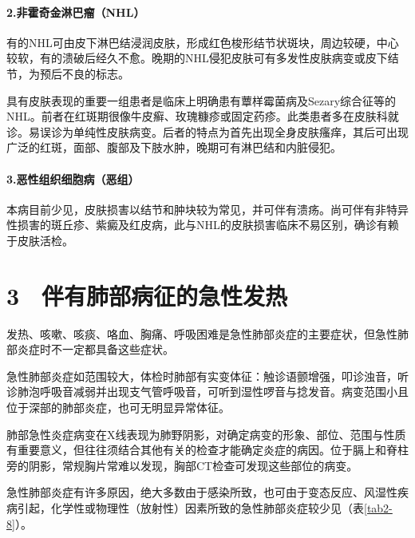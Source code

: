 \paragraph{2.非霍奇金淋巴瘤（NHL）}

有的NHL可由皮下淋巴结浸润皮肤，形成红色梭形结节状斑块，周边较硬，中心较软，有的溃破后经久不愈。晚期的NHL侵犯皮肤可有多发性皮肤病变或皮下结节，为预后不良的标志。

具有皮肤表现的重要一组患者是临床上明确患有蕈样霉菌病及Sezary综合征等的NHL。前者在红斑期很像牛皮癣、玫瑰糠疹或固定药疹。此类患者多在皮肤科就诊。易误诊为单纯性皮肤病变。后者的特点为首先出现全身皮肤瘙痒，其后可出现广泛的红斑，面部、腹部及下肢水肿，晚期可有淋巴结和内脏侵犯。

\paragraph{3.恶性组织细胞病（恶组）}

本病目前少见，皮肤损害以结节和肿块较为常见，并可伴有溃疡。尚可伴有非特异性损害的斑丘疹、紫癜及红皮病，此与NHL的皮肤损害临床不易区别，确诊有赖于皮肤活检。

\protect\hypertarget{text00025.html}{}{}

\section{3　伴有肺部病征的急性发热}

发热、咳嗽、咳痰、咯血、胸痛、呼吸困难是急性肺部炎症的主要症状，但急性肺部炎症时不一定都具备这些症状。

急性肺部炎症如范围较大，体检时肺部有实变体征：触诊语颤增强，叩诊浊音，听诊肺泡呼吸音减弱并出现支气管呼吸音，可听到湿性啰音与捻发音。病变范围小且位于深部的肺部炎症，也可无明显异常体征。

肺部急性炎症病变在X线表现为肺野阴影，对确定病变的形象、部位、范围与性质有重要意义，但往往须结合其他有关的检查才能确定炎症的病因。位于膈上和脊柱旁的阴影，常规胸片常难以发现，胸部CT检查可发现这些部位的病变。

急性肺部炎症有许多原因，绝大多数由于感染所致，也可由于变态反应、风湿性疾病引起，化学性或物理性（放射性）因素所致的急性肺部炎症较少见（表\ref{tab2-8}）。

